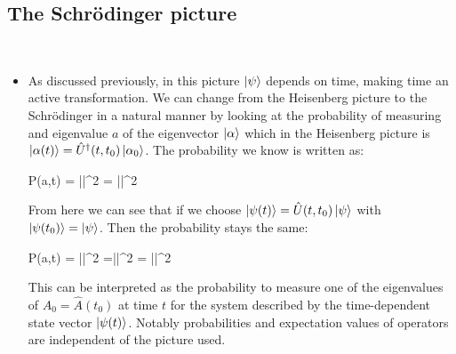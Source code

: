 \documentclass[11pt]{article}
\numberwithin{equation}{section}
\newenvironment{bux}
    {
    \empheq[box=\tcbhighmath]{align}
   }{
    \endempheq
    }
\begin{document}
\subsection{The Schr\"odinger picture} \
\begin{itemize}
    \item As discussed previously, in this picture $\ket{\psi}$ depends on time, making time an active transformation. We can change from the Heisenberg picture to the Schr\"odinger in a natural manner by looking at the probability of measuring and eigenvalue $a$ of the eigenvector $\ket{\alpha}$ which in the Heisenberg picture is $\ket{\alpha(t)} = \hat{U}^{\dagger}(t,t_0)\ket{\alpha_0}$. The probability we know is written as:
\begin{bux}
    \begin{split}
        P(a,t) = ||^2 = ||^2
    \end{split}
\end{bux}
From here we can see that if we choose $\ket{\psi(t)} =  \hat{U}(t,t_0)\ket{\psi}$ with $\ket{\psi(t_0)} = \ket{\psi}$. Then the probability stays the same:
\begin{bux}
    \begin{split}
        P(a,t) = ||^2 =||^2 = ||^2
    \end{split}
\end{bux}
This can be interpreted as the probability to measure one of the eigenvalues of $\hat{A}_0 = \hat{A}(t_0)$ at time $t$ for the system described by the time-dependent state vector $\ket{\psi(t)}$.  Notably probabilities and expectation values of operators are independent of the picture used. 


\end{itemize}
\end{document}
